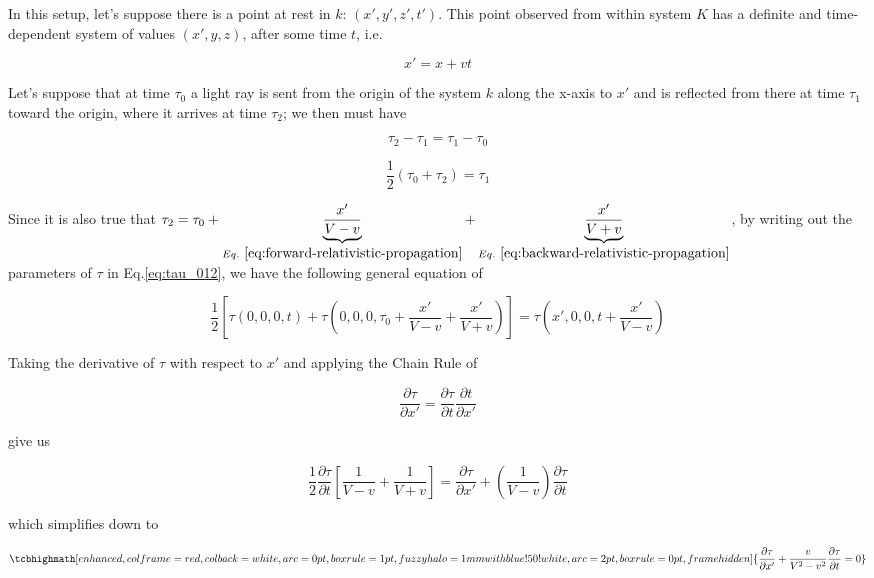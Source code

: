 In this setup, let's suppose there is a point at rest in $k$: $(x', y', z', t')$. This point observed from within system $K$ has a definite
and time-dependent system of values $(x', y, z)$, after some time $t$, i.e.

\[
    x' = x + vt
\]

Let's suppose that at time $\tau_0$ a light ray is sent from the origin of the system $k$ along the x-axis to $x'$ and
is reflected from there at time $\tau_1$ toward the origin, where it arrives at time $\tau_2$; we then must have

\[
    \tau_2 - \tau_1 = \tau_1 - \tau_0
\]

\begin{equation} \label{eq:tau_012}
\frac{1}{2}(\tau_0 + \tau_2) = \tau_1
\end{equation}

Since it is also true that
$\tau_2 = \tau_0 + \underbrace{\frac{x'}{V - v}}_{Eq.~\ref{eq:forward-relativistic-propagation}} + \underbrace{\frac{x'}{V + v}}_{Eq.~\ref{eq:backward-relativistic-propagation}}$,
by writing out the parameters of $\tau$ in Eq.\ref{eq:tau_012}, we have the following general equation of

\begin{equation}
    \frac{1}{2}\left[ \tau(0, 0, 0, t) + \tau\left( 0, 0, 0, \tau_0 + \frac{x'}{V - v} + \frac{x'}{V + v} \right) \right] = \tau\left( x', 0, 0, t + \frac{x'}{V -v} \right)
\end{equation}

Taking the derivative of $\tau$ with respect to $x'$ and applying the Chain Rule of

\[
    \frac{\partial\tau}{\partial x'} = \frac{\partial\tau}{\partial t}\frac{\partial t}{\partial x'}
\]

give us

\begin{equation}
    \frac{1}{2}\frac{\partial\tau}{\partial t}\left[ \frac{1}{V - v} + \frac{1}{V + v} \right] = \frac{\partial\tau}{\partial x'} + \left( \frac{1}{V - v} \right)\frac{\partial\tau}{\partial t}
\end{equation}

which simplifies down to

\begin{equation}\label{eq:tau_t_general}
\tcbhighmath[
    enhanced,colframe=red,colback=white,arc=0pt,boxrule=1pt,
    fuzzy halo=1mm with blue!50!white,
    arc=2pt,
    boxrule=0pt,
    frame hidden
]{
    \frac{\partial\tau}{\partial x'} + \frac{v}{V^2 - v^2}\frac{\partial\tau}{\partial t} = 0
}
\end{equation}

